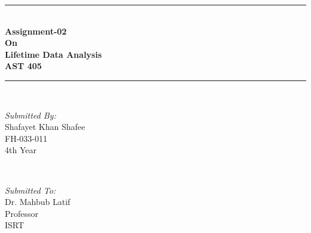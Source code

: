 \documentclass[12pt]{article}
\begin{document}
\begin{titlepage}

\newcommand{\HRule}{\rule{\linewidth}{0.5mm}} %

\center %




\HRule \\[0.25cm]
{ \huge \bfseries Assignment-02}\\[0.06cm]
{ \huge \bfseries On}\\[0.08cm]
{ \huge \bfseries Lifetime Data Analysis}\\[0.08cm]
{ \LARGE \bfseries AST 405}\\[0.05cm]
\HRule \\[1.5cm]



\begin{minipage}{0.4\textwidth}
\begin{flushleft} \large
\emph{Submitted By:}\\
Shafayet Khan Shafee \\FH-033-011\\4th Year
\end{flushleft}
\end{minipage}
~
\begin{minipage}{0.4\textwidth}
\begin{flushright} \large
\emph{Submitted To:} \\
Dr. Mahbub Latif\\Professor\\ISRT
\end{flushright}
\end{minipage}\\[1cm]


\end{titlepage}
\end{document}
